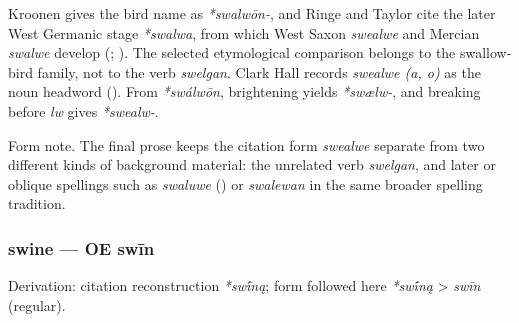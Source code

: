 \documentclass[
  british,
  a4paper,
]{article}
\begin{document}
Kroonen gives the bird name as \emph{*swalwōn-}, and Ringe and Taylor
cite the later West Germanic stage \emph{*swalwa}, from which West Saxon
\emph{swealwe} and Mercian \emph{swalwe} develop
(;
). The
selected etymological comparison belongs to the swallow-bird family, not
to the verb \emph{swelgan}. Clark Hall records \emph{swealwe (a, o)} as
the noun headword ().
From \emph{*swálwōn}, brightening yields \emph{*swælw-}, and breaking
before \emph{lw} gives \emph{*swealw-}.

Form note. The final prose keeps the citation form \emph{swealwe}
separate from two different kinds of background material: the unrelated
verb \emph{swelgan}, and later or oblique spellings such as
\emph{swaluwe} ()
or \emph{swalewan} in the same broader spelling tradition.

\subsubsection{swine --- OE swīn}\label{swine-oe-swux12bn}

Derivation: citation reconstruction \emph{*swī́ną}; form followed here
\emph{*swī́ną} \textgreater{} \emph{swīn} (regular).

\begingroup
\setlength{\fboxsep}{6pt}
\end{document}

